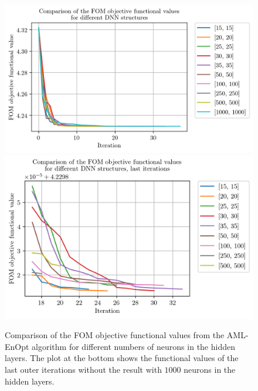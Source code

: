 \begin{figure}
\centering
\includegraphics{Plots/DNNStruct.png}
\includegraphics{Plots/DNNStructLastIter.png}
\caption{\label{DNNStructComparison}Comparison of the FOM objective functional values from the AML-EnOpt algorithm for different numbers of neurons in the hidden layers. The plot at the bottom shows the functional values of the last outer iterations without the result with $1000$ neurons in the hidden layers.}
\end{figure}



